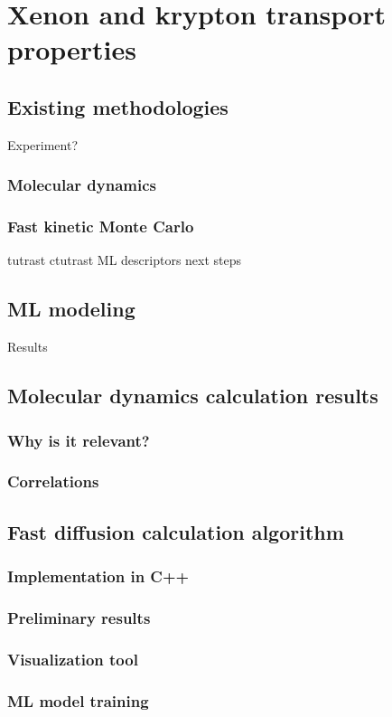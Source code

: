 \documentclass[main]{subfiles}
\begin{document}
\chapter{Xenon and krypton transport properties}
\vspace*{-1\baselineskip}

\section{Existing methodologies}

Experiment?


\subsection{Molecular dynamics}

\subsection{Fast kinetic Monte Carlo}
tutrast
ctutrast\cite{Mace_2019}
ML descriptors
next steps

\section{ML modeling}

Results

\section{Molecular dynamics calculation results}

\subsection{Why is it relevant?}

\subsection{Correlations}

\section{Fast diffusion calculation algorithm}

\subsection{Implementation in C++}

\subsection{Preliminary results}

\subsection{Visualization tool}

\subsection{ML model training}

\OnlyInSubfile{\printglobalbibliography}
\end{document}
